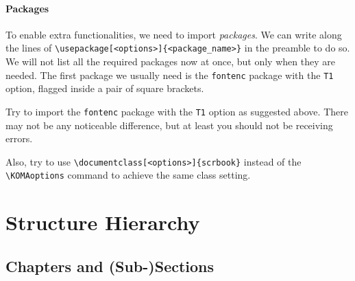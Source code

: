 \paragraph{Packages} To enable extra functionalities, we need to import \textit{packages}. We can write along the lines of \texttt{\textbackslash usepackage[<options>]\{<package\_name>\}} in the preamble to do so. We will not list all the required packages now at once, but only when they are needed. The first package we usually need is the \verb|fontenc| package with the \verb|T1| option, flagged inside a pair of square brackets.

\begin{exercisebox}
\begin{Exercise}
Try to import the \verb|fontenc| package with the \verb|T1| option as suggested above. There may not be any noticeable difference, but at least you should not be receiving errors.
\end{Exercise}
\begin{Exercise}
Also, try to use \texttt{\textbackslash documentclass[<options>]\{scrbook\}} instead of the \texttt{\textbackslash KOMAoptions} command to achieve the same class setting.
\end{Exercise}
\end{exercisebox}

\section{Structure Hierarchy}

\subsection{Chapters and (Sub-)Sections}

